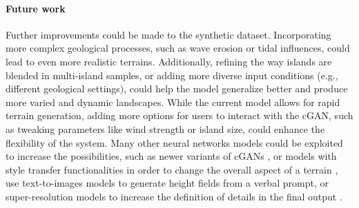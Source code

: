 \documentclass{egpubl}
\begin{document}
\paragraph{Future work}
Further improvements could be made to the synthetic dataset. Incorporating more complex geological processes, such as wave erosion or tidal influences, could lead to even more realistic terrains. Additionally, refining the way islands are blended in multi-island samples, or adding more diverse input conditions (e.g., different geological settings), could help the model generalize better and produce more varied and dynamic landscapes.  While the current model allows for rapid terrain generation, adding more options for users to interact with the cGAN, such as tweaking parameters like wind strength or island size, could enhance the flexibility of the system. 
Many other neural networks models could be exploited to increase the possibilities, such as newer variants of cGANs \cite{Park2019}, or models with style transfer functionalities \cite{Gatys2015,Zhu2020} in order to change the overall aspect of a terrain \cite{Perche2023a,Perche2023b}, use text-to-images models \cite{Rombach2021,Radford2021} to generate height fields from a verbal prompt, or super-resolution models \cite{Dong2014} to increase the definition of details in the final output \cite{Guerin2016a}.




\end{document}
